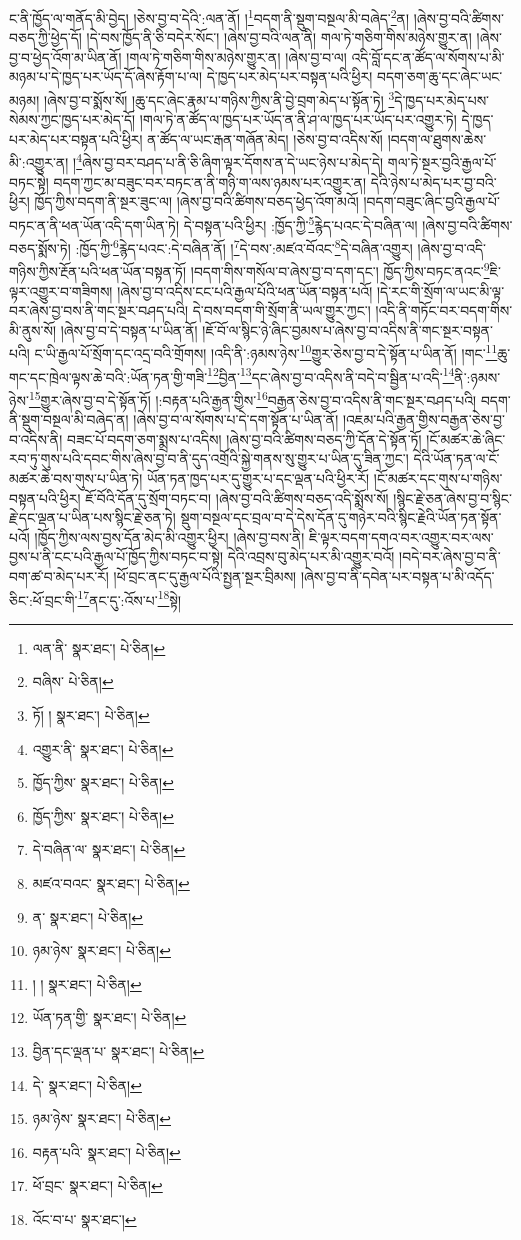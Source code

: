 ང་ནི་ཁྱོད་ལ་གནོད་མི་བྱེད། །ཅེས་བྱ་བ་དེའི་:ལན་ནོ། །\footnote{ལན་ནི་  སྣར་ཐང་།  པེ་ཅིན། }བདག་ནི་སྡུག་བསྔལ་མི་བཞེད་\footnote{བཞིས་  པེ་ཅིན། }ན། །ཞེས་བྱ་བའི་ཚིགས་བཅད་ཀྱི་ཕྱེད་དོ། །དེ་བས་ཁྱོད་ནི་ཅི་བདེར་སོང་། །ཞེས་བྱ་བའི་ལན་ནི། གལ་ཏེ་གཅིག་གིས་མཉེས་གྱུར་ན། །ཞེས་བྱ་བ་ཕྱེད་འོག་མ་ཡིན་ནོ། །གལ་ཏེ་གཅིག་གིས་མཉེས་གྱུར་ན། །ཞེས་བྱ་བ་ལ། འདི་བློ་དང་ན་ཚོད་ལ་སོགས་པ་མི་མཉམ་པ་དེ་ཁྱད་པར་ཡོད་དོ་ཞེས་རྟོག་པ་ལ། དེ་ཁྱད་པར་མེད་པར་བསྟན་པའི་ཕྱིར། བདག་ཅག་ཆུ་དང་ཞེང་ཡང་མཉམ། །ཞེས་བྱ་བ་སྨོས་སོ། །ཆུ་དང་ཞེང་རྣམ་པ་གཉིས་ཀྱིས་ནི་བྱེ་བྲག་མེད་པ་སྟོན་ཏེ། \footnote{ཏོ། །   སྣར་ཐང་།  པེ་ཅིན། }དེ་ཁྱད་པར་མེད་པས་སེམས་ཀྱང་ཁྱད་པར་མེད་དོ། །གལ་ཏེ་ན་ཚོད་ལ་ཁྱད་པར་ཡོད་ན་ནི་ཤ་ལ་ཁྱད་པར་ཡོད་པར་འགྱུར་ཏེ། དེ་ཁྱད་པར་མེད་པར་བསྟན་པའི་ཕྱིར། ན་ཚོད་ལ་ཡང་རྒན་གཞོན་མེད། །ཅེས་བྱ་བ་འདིས་སོ། །བདག་ལ་ཐུགས་ཆེས་མི་:འགྱུར་ན། །\footnote{འགྱུར་ནི་  སྣར་ཐང་།  པེ་ཅིན། }ཞེས་བྱ་བར་བཤད་པ་ནི་ཅི་ཞིག་ལྟར་དོགས་ན་དེ་ཡང་ཉེས་པ་མེད་དེ། གལ་ཏེ་སྔར་བྱའི་རྒྱལ་པོ་བཏང་སྟེ། བདག་ཀྱང་མ་བཟུང་བར་བཏང་ན་ནི་གཉི་ག་ལས་ཉམས་པར་འགྱུར་ན། དེའི་ཉེས་པ་མེད་པར་བྱ་བའི་ཕྱིར། ཁྱོད་ཀྱིས་བདག་ནི་སྔར་ཟུང་ལ། །ཞེས་བྱ་བའི་ཚིགས་བཅད་ཕྱེད་འོག་མའོ། །བདག་བཟུང་ཞིང་བྱའི་རྒྱལ་པོ་བཏང་ན་ནི་ཕན་ཡོན་འདི་དག་ཡིན་ཏེ། དེ་བསྟན་པའི་ཕྱིར། :ཁྱོད་ཀྱི་\footnote{ཁྱོད་ཀྱིས་  སྣར་ཐང་།  པེ་ཅིན། }རྙེད་པའང་དེ་བཞིན་ལ། །ཞེས་བྱ་བའི་ཚིགས་བཅད་སྨོས་ཏེ། :ཁྱོད་ཀྱི་\footnote{ཁྱོད་ཀྱིས་  སྣར་ཐང་།  པེ་ཅིན། }རྙེད་པའང་:དེ་བཞིན་ནོ། །\footnote{དེ་བཞིན་ལ་  སྣར་ཐང་།  པེ་ཅིན། }དེ་བས་:མཛའ་བོའང་\footnote{མཛའ་བའང་  སྣར་ཐང་།  པེ་ཅིན། }དེ་བཞིན་འགྱུར། །ཞེས་བྱ་བ་འདི་གཉིས་ཀྱིས་རྔོན་པའི་ཕན་ཡོན་བསྟན་ཏོ། །བདག་གིས་གསོལ་བ་ཞེས་བྱ་བ་དག་དང་། ཁྱོད་ཀྱིས་བཏང་ནའང་\footnote{ན་  སྣར་ཐང་།  པེ་ཅིན། }ཇི་ལྟར་འགྱུར་བ་གཟིགས། །ཞེས་བྱ་བ་འདིས་ངང་པའི་རྒྱལ་པོའི་ཕན་ཡོན་བསྟན་པའོ། །དེ་རང་གི་སྲོག་ལ་ཡང་མི་ལྟ་བར་ཞེས་བྱ་བས་ནི་གང་སྔར་བཤད་པའི། དེ་བས་བདག་གི་སྲོག་ནི་ཡལ་གྱུར་ཀྱང་། །འདི་ནི་གཏོང་བར་བདག་གིས་མི་ནུས་སོ། །ཞེས་བྱ་བ་དེ་བསྟན་པ་ཡིན་ནོ། །ཇོ་བོ་ལ་སྙིང་ཉེ་ཞིང་བྱམས་པ་ཞེས་བྱ་བ་འདིས་ནི་གང་སྔར་བསྟན་པའི། ང་ཡི་རྒྱལ་པོ་སྲོག་དང་འདྲ་བའི་གྲོགས། །འདི་ནི་:ཉམས་ཉེས་\footnote{ཉམ་ཉེས་  སྣར་ཐང་།  པེ་ཅིན། }གྱུར་ཅེས་བྱ་བ་དེ་སྟོན་པ་ཡིན་ནོ། །གང་\footnote{། །  སྣར་ཐང་།  པེ་ཅིན། }ཆུ་གང་དང་ཁྲེལ་ལྟས་ཆེ་བའི་:ཡོན་ཏན་གྱི་གཟི་\footnote{ཡོན་ཏན་གྱི་  སྣར་ཐང་།  པེ་ཅིན། }བྱིན་\footnote{བྱིན་དང་ལྡན་པ་  སྣར་ཐང་།  པེ་ཅིན། }དང་ཞེས་བྱ་བ་འདིས་ནི་བདེ་བ་སྦྱིན་པ་འདི་\footnote{དེ་  སྣར་ཐང་།  པེ་ཅིན། }ནི་:ཉམས་ཉེས་\footnote{ཉམ་ཉེས་  སྣར་ཐང་།  པེ་ཅིན། }གྱུར་ཞེས་བྱ་བ་དེ་སྟོན་ཏོ། །:བརྟན་པའི་རྒྱན་གྱིས་\footnote{བརྟན་པའི་  སྣར་ཐང་།  པེ་ཅིན། }བརྒྱན་ཅེས་བྱ་བ་འདིས་ནི་གང་སྔར་བཤད་པའི། བདག་ནི་སྡུག་བསྔལ་མི་བཞེད་ན། །ཞེས་བྱ་བ་ལ་སོགས་པ་དེ་དག་སྟོན་པ་ཡིན་ནོ། །འཇམ་པའི་རྒྱན་གྱིས་བརྒྱན་ཅེས་བྱ་བ་འདིས་ནི། བཟང་པོ་བདག་ཅག་སྨྲས་པ་འདིས། །ཞེས་བྱ་བའི་ཚིགས་བཅད་ཀྱི་དོན་དེ་སྟོན་ཏོ། །ངོ་མཚར་ཆེ་ཞིང་རབ་ཏུ་གུས་པའི་དབང་གིས་ཞེས་བྱ་བ་ནི་དུད་འགྲོའི་སྐྱེ་གནས་སུ་གྱུར་པ་ཡིན་དུ་ཟིན་ཀྱང་། དེའི་ཡོན་ཏན་ལ་ངོ་མཚར་ཆེ་བས་གུས་པ་ཡིན་ཏེ། ཡོན་ཏན་ཁྱད་པར་དུ་གྱུར་པ་དང་ལྡན་པའི་ཕྱིར་རོ། །ངོ་མཚར་དང་གུས་པ་གཉིས་བསྟན་པའི་ཕྱིར། ཇོ་བོའི་དོན་དུ་སྲོག་བཏང་བ། །ཞེས་བྱ་བའི་ཚིགས་བཅད་འདི་སྨོས་སོ། །སྙིང་རྗེ་ཅན་ཞེས་བྱ་བ་སྙིང་རྗེ་དང་ལྡན་པ་ཡིན་པས་སྙིང་རྗེ་ཅན་ཏེ། སྡུག་བསྔལ་དང་བྲལ་བ་དེ་དེས་དོན་དུ་གཉེར་བའི་སྙིང་རྗེའི་ཡོན་ཏན་སྟོན་པའོ། །ཁྱོད་ཀྱིས་ལས་བྱས་དོན་མེད་མི་འགྱུར་ཕྱིར། །ཞེས་བྱ་བས་ནི། ཇི་ལྟར་བདག་དགའ་བར་འགྱུར་བར་ལས་བྱས་པ་ནི་ངང་པའི་རྒྱལ་པོ་ཁྱོད་ཀྱིས་བཏང་བ་སྟེ། དེའི་འབྲས་བུ་མེད་པར་མི་འགྱུར་བའོ། །བདེ་བར་ཞེས་བྱ་བ་ནི་བག་ཚ་བ་མེད་པར་རོ། །ཕོ་བྲང་ནང་དུ་རྒྱལ་པོའི་སྤྱན་སྔར་བྲིམས། །ཞེས་བྱ་བ་ནི་དབེན་པར་བསྟན་པ་མི་འདོད་ཅིང་:ཕོ་བྲང་གི་\footnote{ཕོ་བྲང་  སྣར་ཐང་།  པེ་ཅིན། }ནང་དུ་:འོས་པ་\footnote{འོང་བ་པ་  སྣར་ཐང་། }སྟེ། 